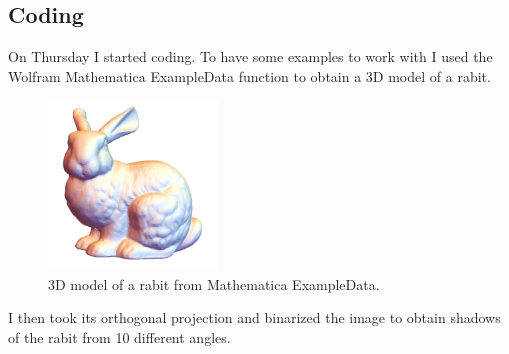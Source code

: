 \documentclass[a4paper]{article}
\begin{document}
\subsection{Coding}
On Thursday I started coding. 
To have some examples to work with I used the Wolfram Mathematica ExampleData function to obtain a 3D model of a rabit.

\begin{figure}[H]
  \centering
    \includegraphics[width=0.4\textwidth]{figures/3D_rabit.png}
    \caption{3D model of a rabit from Mathematica ExampleData.}
  \label{fig:f2}
\end{figure}

I then took its orthogonal projection and binarized the image to obtain shadows of the rabit from 10 different angles.

\begin{figure}[H]
    \begin{floatrow}
    \end{floatrow}
\end{figure}
\end{document}
